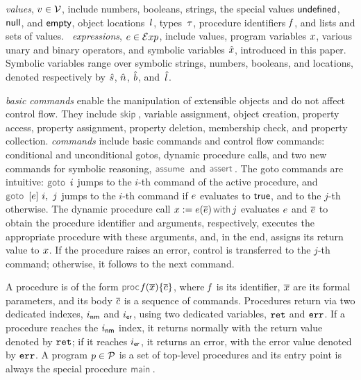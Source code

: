 \vspace{5pt}
\noindent \jsil \emph{values}, $v \in \mathcal{V}$, include numbers, booleans, strings, the special values ${\sf undefined}$, ${\sf null}$, and ${\sf empty}$, object locations~$l$, types~$\tau$, procedure identifiers $\mathit{f}$, and lists and sets of values.
\jsil~\emph{expressions}, $e \in \mathcal{E}xp$, include \jsil values, \jsil program variables $x$, various unary and binary operators, and symbolic variables $\hat{x}$, introduced in this paper. Symbolic variables range over symbolic strings, numbers, booleans, and locations, denoted respectively by $\hat{s}$, $\hat{n}$, $\hat{b}$, and~$\hat{l}$.

%

\jsil \emph{basic commands} enable the manipulation of extensible objects and do not affect control flow. 
They include $\jsilskip$, variable assignment, object creation, property access, property assignment, property deletion, membership check, and property collection.
%
\jsil \emph{commands} include \jsil basic commands and control flow commands: conditional and unconditional gotos, dynamic procedure calls, and two new commands for symbolic reasoning, $\assume$ and $\jassert$.  %
The goto commands are intuitive: $\goto \ i$ jumps to the $i$-th command of the active procedure, and $\ifgoto{\jsilexpr}{i}{j}$ jumps to the $i$-th command if $e$ evaluates to ${\sf true}$, and to the $j$-th otherwise. 
The dynamic procedure call $\jsilcall{\jvar}{\jsilexpr}{\jvec{\jsilexpr}}{j}$ evaluates  $e$ and $\overline{e}$ to obtain the procedure identifier and arguments, respectively, executes the appropriate procedure with these arguments, and, in the end, assigns its return value to $x$.
If the procedure raises an error, control is transferred to the $j$-th command; otherwise, it follows to the next command. 

A \jsil procedure is of the form $\procedure{\pid}{\jvec{\jvar}}{\jvec{\jcmd}}$, where $\mathit{f}$ is its identifier, $\overline{x}$ are its formal parameters, and its body ${\overline{c}}$  is a sequence of \jsil commands. Procedures return via two dedicated indexes, $i_{{\sf nm}}$ and $i_{{\sf er}}$, using two dedicated variables, $\mathtt{ret}$ and $\mathtt{err}$. If a procedure reaches the $i_{{\sf nm}}$ index, it returns normally with the return value denoted by $\mathtt{ret}$; if it reaches $i_{{\sf er}}$, it returns an error, with the error value denoted by $\mathtt{err}$.
A \jsil program $p \in \mathcal{P}$ is a set of top-level procedures and its entry point is always the special procedure $\jsilmain$\hspace{-2pt}.


